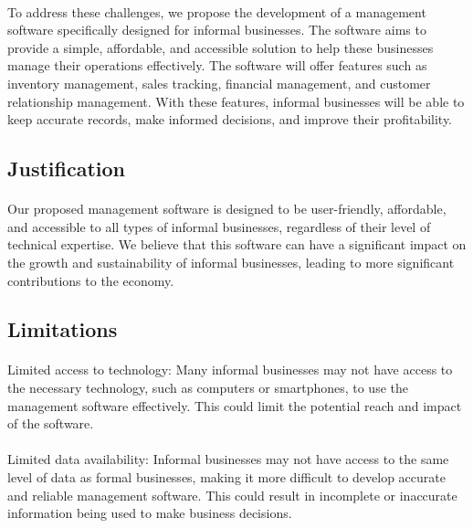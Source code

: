 \documentclass{article}
\begin{document}
\paragraph*{}
To address these challenges, we propose the development of a management software specifically designed for informal businesses. The software aims to provide a simple, affordable, and accessible solution to help these businesses manage their operations effectively. The software will offer features such as inventory management, sales tracking, financial management, and customer relationship management. With these features, informal businesses will be able to keep accurate records, make informed decisions, and improve their profitability.

\subsection{Justification}
\paragraph*{}
Our proposed management software is designed to be user-friendly, affordable, and accessible to all types of informal businesses, regardless of their level of technical expertise. We believe that this software can have a significant impact on the growth and sustainability of informal businesses, leading to more significant contributions to the economy.

\subsection{Limitations}
\paragraph*{}
Limited access to technology: Many informal businesses may not have access to the necessary technology, such as computers or smartphones, to use the management software effectively. This could limit the potential reach and impact of the software.

\paragraph*{}
Limited data availability: Informal businesses may not have access to the same level of data as formal businesses, making it more difficult to develop accurate and reliable management software. This could result in incomplete or inaccurate information being used to make business decisions.
\end{document}
